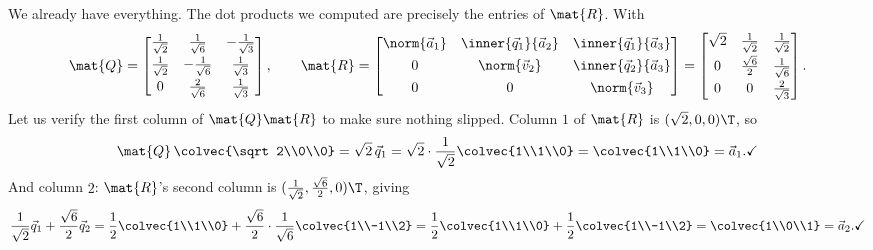 We already have everything. The dot products we computed are precisely the entries of
$\mat{R}$. With
\[
  \mat{Q}=
  \begin{bmatrix}
    \tfrac{1}{\sqrt2} & \tfrac{1}{\sqrt6} & -\tfrac{1}{\sqrt3}\\[4pt]
    \tfrac{1}{\sqrt2} & -\tfrac{1}{\sqrt6} & \tfrac{1}{\sqrt3}\\[4pt]
    0 & \tfrac{2}{\sqrt6} & \tfrac{1}{\sqrt3}
  \end{bmatrix},
  \qquad
  \mat{R}=
  \begin{bmatrix}
    \norm{\vec{a}_1} & \inner{\vec{q}_1}{\vec{a}_2} & \inner{\vec{q}_1}{\vec{a}_3}\\[4pt]
    0 & \norm{\vec{v}_2} & \inner{\vec{q}_2}{\vec{a}_3}\\[4pt]
    0 & 0 & \norm{\vec{v}_3}
  \end{bmatrix}
  =
  \begin{bmatrix}
    \sqrt2 & \tfrac{1}{\sqrt2} & \tfrac{1}{\sqrt2}\\[4pt]
    0 & \tfrac{\sqrt6}{2} & \tfrac{1}{\sqrt6}\\[4pt]
    0 & 0 & \tfrac{2}{\sqrt3}
  \end{bmatrix}.
\]
Let us verify the first column of $\mat{Q}\mat{R}$ to make sure nothing slipped. Column
$1$ of $\mat{R}$ is $(\sqrt2,0,0)\T$, so
\[
  \mat{Q}\,\colvec{\sqrt2\\0\\0}
  = \sqrt2\,\vec{q}_1
  = \sqrt2\cdot\frac{1}{\sqrt2}\colvec{1\\1\\0}
  = \colvec{1\\1\\0}
  = \vec{a}_1. \checkmark
\]
And column $2$: $\mat{R}$'s second column is
$(\tfrac{1}{\sqrt2},\tfrac{\sqrt6}{2},0)\T$, giving
\[
  \frac{1}{\sqrt2}\vec{q}_1 + \frac{\sqrt6}{2}\vec{q}_2
  = \frac12\colvec{1\\1\\0} + \frac{\sqrt6}{2}\cdot\frac{1}{\sqrt6}\colvec{1\\-1\\2}
  = \frac12\colvec{1\\1\\0} + \frac12\colvec{1\\-1\\2}
  = \colvec{1\\0\\1}
  = \vec{a}_2. \checkmark
\]

